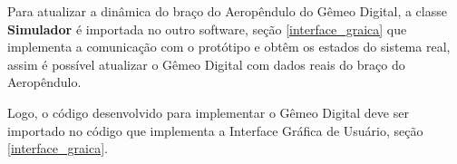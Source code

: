 Para atualizar a dinâmica do braço do Aeropêndulo do Gêmeo Digital, a classe \textbf{Simulador} é importada no outro software, seção \ref{interface_graica} que implementa a comunicação com o protótipo e obtêm os estados do sistema real, assim é possível atualizar o Gêmeo Digital com dados reais do braço do Aeropêndulo.

Logo, o código desenvolvido para implementar o Gêmeo Digital deve ser importado no código que implementa a Interface Gráfica de Usuário, seção \ref{interface_graica}.